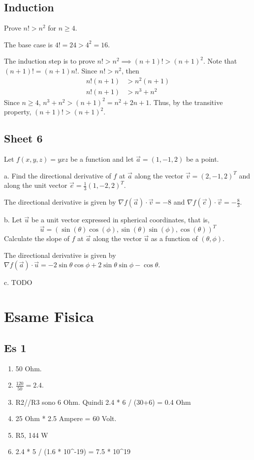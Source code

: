 \documentclass[a4paper]{article}
\begin{document}
\subsection{Induction}

Prove \(n! > n^2\) for \(n \geq 4\).

The base case is \(4!=24 > 4^2 = 16\).

The induction step is to prove \(n! > n^2 \implies (n +1)! > {(n+1)}^2\).
Note that \((n+1)!=(n+1)n!\).
Since \(n! > n^2\), then
\begin{align*}
    n!(n+1) &> n^2(n+1) \\
    n!(n+1) &> n^3 + n^2
\end{align*}
Since \(n \geq 4\), \(n^3 + n^2 > {(n+1)}^2=n^2+2n+1\).
Thus, by the transitive property, \((n+1)! > {(n+1)}^2\).

\subsection{Sheet 6}

Let \(f(x,y,z)=yxz\) be a function and let \(\vec{a}=(1,-1,2)\) be a point.

a. Find the directional derivative of \(f\) at \(\vec{a}\) along the vector \(\vec{v}=(2,-1,2)^T\)
and along the unit vector \(\vec{e} = \frac{1}{3}(1,-2,2)^T\).

The directional derivative is given by \(\nabla f(\vec{a}) \cdot \vec{v} = -8\)
and \(\nabla f(\vec{e}) \cdot \vec{v} = -\frac{8}{3}\).

b. Let \(\vec{u}\) be a unit vector expressed in spherical coordinates, that is,
\[ \vec{u} = (\sin(\theta)\cos(\phi), \sin(\theta)\sin(\phi), \cos(\theta))^T \]
Calculate the slope of \(f\) at \(\vec{a}\) along the vector \(\vec{u}\) as a function of \((\theta, \phi)\).

The directional derivative is given by \(\nabla f(\vec{a}) \cdot \vec{u} = -2\sin\theta\cos\phi+2\sin\theta\sin\phi-\cos\theta\).

c. TODO

\pagebreak

\section{Esame Fisica}

\subsection{Es 1}

\begin{enumerate}
    \item 50 Ohm.
    \item \(\frac{120}{50}=2.4\).
    \item R2//R3 sono 6 Ohm. Quindi 2.4 * 6 / (30+6) = 0.4 Ohm
    \item 25 Ohm * 2.5 Ampere = 60 Volt.
    \item R5, 144 W
    \item 2.4 * 5 / (1.6 * 10^-19) = 7.5 * 10^19
\end{enumerate}
\end{document}
